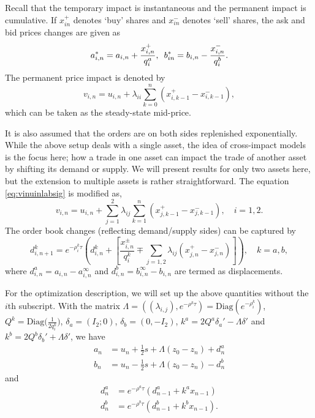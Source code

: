 Recall that the temporary impact is instantaneous and the permanent impact is cumulative. If $x_{in}^+$ denotes `buy' shares and $x_{in}^-$ denotes `sell' shares, the ask and bid prices changes are given as
	\begin{equation}
	a_{i,n}^*= a_{i,n} + \dfrac{x_{i,n}^+}{q_i^a}, \enskip b_{in}^*= b_{i,n} - \dfrac{x_{i,n}^-}{q_i^b}.
	\end{equation}
The permanent price impact is denoted by
	\begin{equation} \label{eq:vinuinlabsig}
	v_{i,n}= u_{i,n} + \lambda_{ii} \sum_{k=0}^n (x_{i,k-1}^+ - x_{i,k-1}^-),
	\end{equation}
which can be taken as the steady-state mid-price. 


It is also assumed that the orders are on both sides replenished exponentially. While the above setup deals with a single asset, the idea of cross-impact models is the focus here; how a trade in one asset can impact the trade of another asset by shifting its demand or supply. We will present results for only two assets here, but the extension to multiple assets is rather straightforward. The equation \eqref{eq:vinuinlabsig} is modified as,
	\begin{equation}
	v_{i,n}= u_{i,n} + \sum_{j=1}^2 \lambda_{ij} \sum_{k=1}^n (x_{j,k-1}^+ - x_{j,k-1}^-), \quad i=1,2.
	\end{equation}
The order book changes (reflecting demand/supply sides) can be captured by
	\begin{equation}
	d_{i,n+1}^k = e^{-\rho_i^k \tau} \left( d_{i,n}^k + \left[ \dfrac{x_{i,n}^\pm}{q_i^k} \mp \sum_{j=1,2} \lambda_{ij} (x_{j,n}^+ - x_{j,n}^-) \right] \right), \quad k=a,b,
	\end{equation}
where $d_{i,n}^a= a_{i,n} - a_{i,n}^\infty$ and $d_{i,n}^b= b_{i,n}^\infty - b_{i,n}$ are termed as displacements. 


For the optimization description, we will set up the above quantities without the $i$th subscript. With the matrix $\Lambda= ((\lambda_{i,j}), e^{-\rho^k \tau})= \text{Diag}(e^{-\rho_i^k})$, $Q^k= \text{Diag}\big( \frac{1}{2q_i^k} \big)$, $\delta_a= (I_2;0)$, $\delta_b= (0, -I_2)$, $k^a= 2Q^a \delta_a' - \Lambda \delta'$ and $k^b= 2Q^b \delta_b' + \Lambda \delta'$, we have
	\begin{equation}
	\begin{split}
	a_n&= u_n + \frac{1}{2}s + \Lambda(z_0 - z_n) + d_n^a \\
	b_n&= u_n - \frac{1}{2}s + \Lambda(z_0 - z_n) - d_n^b 
	\end{split}
	\end{equation}
and
	\begin{equation}
	\begin{split}
	d_n^a&= e^{-\rho^a \tau} (d_{n-1}^a + k^a x_{n-1}) \\
	d_n^b&= e^{-\rho^b \tau} (d_{n-1}^b + k^b x_{n-1}).
	\end{split}
	\end{equation}


